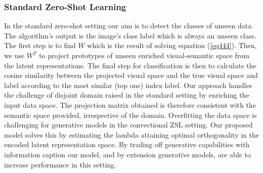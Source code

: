 \documentclass{article}
\begin{document}
\subsubsection{Standard Zero-Shot Learning}
In the standard zero-shot setting our aim is to detect the classes of unseen data. The algorithm's output is the image's class label which is always an unseen class. The first step is to find $W$ which is the result of solving equation (\ref{eq444}). Then, we use $W^T$ to project prototypes of unseen enriched visual-semantic space from the latent representations. The final step for classification is then to calculate the cosine similarity between the projected visual space and the true visual space and label according to the most similar (top one) index label. Our approach handles the challenge of disjoint domain raised in the standard setting by enriching the input data space. The projection matrix obtained is therefore consistent with the semantic space provided, irrespective of the domain. Overfitting the data space is challenging for generative models in the convectional ZSL setting. Our proposed model solves this by estimating the lambda attaining optimal orthogonality in the encoded latent representation space. By trading off generative capabilities with information caption our model, and by extension generative models, are able to increase performance in this setting.

\end{document}

